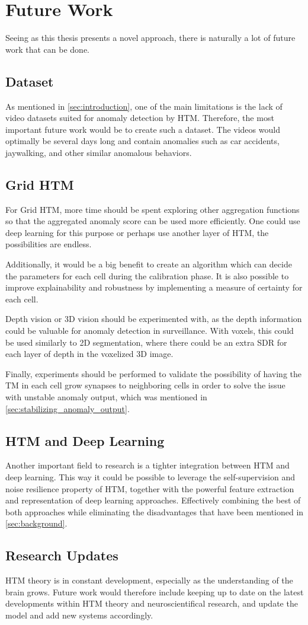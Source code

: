 \section{Future Work}
Seeing as this thesis presents a novel approach, there is naturally a lot of future work that can be done.
\subsection*{Dataset}
As mentioned in \autoref{sec:introduction}, one of the main limitations is the lack of video datasets suited for anomaly detection by HTM. Therefore, the most important future work would be to create such a dataset. The videos would optimally be several days long and contain anomalies such as car accidents, jaywalking, and other similar anomalous behaviors.
\par
\subsection*{Grid HTM}
For Grid HTM, more time should be spent exploring other aggregation functions so that the aggregated anomaly score can be used more efficiently. One could use deep learning for this purpose or perhaps use another layer of HTM, the possibilities are endless.
\par
Additionally, it would be a big benefit to create an algorithm which can decide the parameters for each cell during the calibration phase. It is also possible to improve explainability and robustness by implementing a measure of certainty for each cell.
\par
Depth vision or 3D vision should be experimented with, as the depth information could be valuable for anomaly detection in surveillance. With voxels, this could be used similarly to 2D segmentation, where there could be an extra SDR for each layer of depth in the voxelized 3D image.
\par
Finally, experiments should be performed to validate the possibility of having the TM in each cell grow synapses to neighboring cells in order to solve the issue with unstable anomaly output, which was mentioned in \autoref{sec:stabilizing_anomaly_output}.
\subsection*{HTM and Deep Learning}
Another important field to research is a tighter integration between HTM and deep learning. This way it could be possible to leverage the self-supervision and noise resilience property of HTM, together with the powerful feature extraction and representation of deep learning approaches. Effectively combining the best of both approaches while eliminating the disadvantages that have been mentioned in \autoref{sec:background}.
\par
\subsection*{Research Updates}
HTM theory is in constant development, especially as the understanding of the brain grows. Future work would therefore include keeping up to date on the latest developments within HTM theory and neuroscientifical research, and update the model and add new systems accordingly.